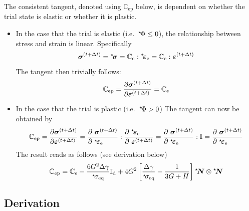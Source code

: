 \documentclass[times,namecite]{goose-article}
\newcommand\leftstar[1]{\hspace*{-.3em}~^\star\!#1}
\begin{document}
The consistent tangent, denoted using $\mathbb{C}_\mathrm{ep}$ below, is dependent on whether the trial state is elastic or whether it is plastic.
\begin{itemize}
%
\item In the case that the trial is elastic (i.e.\ $\leftstar{\Phi} \leq 0$), the relationship between stress and strain is linear. Specifically
\begin{equation}
  \bm{\sigma}^{(t+\Delta t)}
    = \leftstar{\bm{\sigma}}
    = \mathbb{C}_\mathrm{e} : \leftstar{\bm{\varepsilon}}_\mathrm{e}
    = \mathbb{C}_\mathrm{e} : \bm{\varepsilon}^{(t+\Delta t)}
\end{equation}
The tangent then trivially follows:
\begin{equation}
  \mathbb{C}_\mathrm{ep}
  =
  \frac{
    \partial  \bm{\sigma}^{(t+\Delta t)} \hfill
  }{
    \partial \bm{\varepsilon}^{(t+\Delta t)} \hfill
  }
  =
  \mathbb{C}_\mathrm{e}
\end{equation}
%
\item In the case that the trial is plastic (i.e.\ $\leftstar{\Phi} > 0$)
The tangent can now be obtained by
\begin{equation}
  \mathbb{C}_\mathrm{ep}
  =
  \frac{
    \partial  \bm{\sigma}^{(t+\Delta t)} \hfill
  }{
    \partial \bm{\varepsilon}^{(t+\Delta t)} \hfill
  }
  =
  \frac{
    \partial ~\bm{\sigma}^{(t+\Delta t)} \hfill
  }{
    \partial \;\leftstar{\bm{\varepsilon}}_\mathrm{e} \hfill
  }
  :
  \frac{
    \partial \;\leftstar{\bm{\varepsilon}}_\mathrm{e} \hfill
  }{
    \partial ~\bm{\varepsilon}^{(t+\Delta t)}
  }
  =
  \frac{
    \partial ~\bm{\sigma}^{(t+\Delta t)} \hfill
  }{
    \partial \;\leftstar{\bm{\varepsilon}}_\mathrm{e} \hfill
  }
  :
  \mathbb{I}
  =
  \frac{
    \partial ~\bm{\sigma}^{(t+\Delta t)} \hfill
  }{
    \partial \;\leftstar{\bm{\varepsilon}}_\mathrm{e} \hfill
  }
\end{equation}
The result reads as follows (see derivation below)
\begin{equation}
  \mathbb{C}_\mathrm{ep}
  =
  \mathbb{C}_\mathrm{e} -
  \frac{6 G^2 \Delta \gamma}{\leftstar{\sigma}_\mathrm{eq}}
  \mathbb{I}_\mathrm{d}
  + 4 G^2
  \left[
    \frac{\Delta \gamma}{\leftstar{\sigma}_\mathrm{eq}} -
    \frac{1}{3 G + H}
  \right]
  \leftstar{\bm{N}} \otimes \leftstar{\bm{N}}
\end{equation}
%
\end{itemize}

\subsection*{Derivation}
\end{document}

